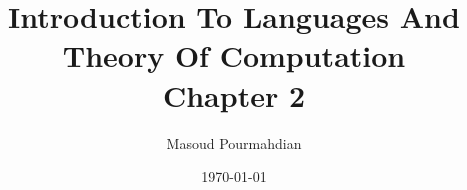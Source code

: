 
\usepackage{amsmath, amssymb}
\usepackage{tikz}
\usetikzlibrary{positioning}
\usetikzlibrary{arrows.meta}
\usetikzlibrary{calc}
\usetikzlibrary{backgrounds}

\newcommand{\term}[1]{``\textsc{#1}''}
\usepackage{booktabs}
\usepackage{booktabs,caption}
\usepackage{amsthm}
\usepackage{amsmath}
\usepackage{amsfonts}
\usepackage{mathtools}
\newcommand{\ringcong}{\mathrel{\overset{\text{\footnotesize{حلقه‌ای}}}{\cong}}}
\newcommand{\modulecong}{\mathrel{\overset{\text{\footnotesize{مدولی}}}{\cong}}}



\usepackage{xepersian}  %




\title{Introduction To Languages And Theory Of Computation \\ Chapter 2}
\date{\today}
\author{Masoud Pourmahdian}


